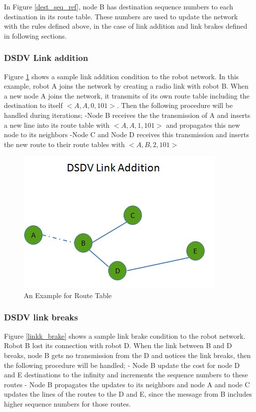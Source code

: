 In Figure \ref{dest_seq_ref}, node B has destination sequence numbers to each destination in its route table. These numbers are used to update the network with the rules defined above, in the case of link addition and link brakes defined in following sections.
	
\subsubsection{DSDV Link addition}

Figure \ref{linkk_addition} shows a sample link addition condition to the robot network. In this example, robot A joins the network by creating a radio link with robot B. When a new node A joins the network, it transmits of its own route table including the destination to itself $<A,A,0,101>$. Then the following procedure will be handled during iterations; \newline
	-Node B receives the the transmission of A and inserts a new line into its route table with $<A,A,1,101>$ and propagates this new node to its neighbors \newline
	-Node C and Node D receives this transmission and inserts the new route to their route tables with $<A,B,2,101>$

\begin{figure}[H]
\caption{An Example for Route Table} \label{linkk_addition}
\centering
\includegraphics[scale = 0.65]{link_add}
\end{figure}	
		
\subsubsection{DSDV link breaks}

Figure \ref{linkk_brake} shows a sample link brake condition to the robot network. Robot B lost its connection with robot D. When the link between B and D breaks, node B gets no transmission from the D and notices the link breaks, then the following procedure will be handled; \newline
	- Node B update the cost for node D and E destinations to the infinity and increments the sequence numbers to these routes \newline
	- Node B propagates the updates to its neighbors and node A and node C updates the lines of the routes to the D and E, since the message from B includes higher sequence numbers for those routes.
		
